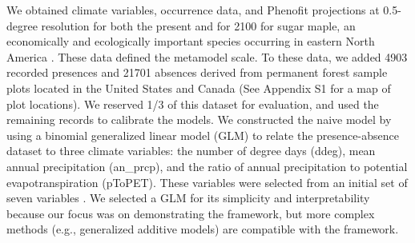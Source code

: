 \documentclass[11pt]{article}
\newcommand{\rev}[1]{{\color{RoyalBlue}#1}}
\begin{document}
We obtained climate variables, occurrence data, and Phenofit projections at 0.5-degree resolution for both the present and for \rev{2100} for sugar maple, an economically and ecologically important species occurring in eastern North America \citep{Morin2009}.
These data defined the metamodel scale.
To these data, we added 4903 recorded presences and 21701 absences derived from permanent forest sample plots located in the United States and Canada (See Appendix S1 for a map of plot locations).
We reserved 1/3 of this dataset for evaluation, and used the remaining records to calibrate the models.
We constructed the naive model by using a binomial generalized linear model (GLM) to relate the presence-absence dataset to three climate variables: the number of degree days (ddeg), mean annual precipitation (an\_prcp), and the ratio of annual precipitation to potential evapotranspiration (pToPET).
These variables were selected from an initial set of \rev{seven} variables \citep[see Appendix S1 and ][for details on the climate variables]{Morin2009}.
We selected a GLM for its simplicity and interpretability because our focus was on demonstrating the framework, but more complex methods (e.g., generalized additive models) are compatible with the framework.
\end{document}
